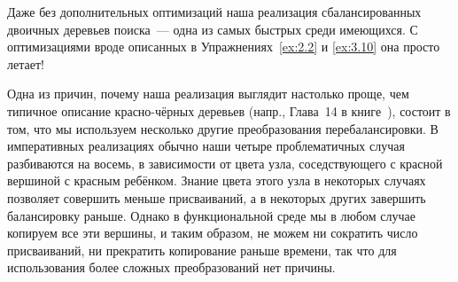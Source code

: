 \begin{frame}[fragile]{}
\begin{figure}[h]
  \centering
  
  \label{fig:3.5}
\end{figure}
\end{frame}

\begin{frame}[fragile]{}
\begin{figure}[h]
  \centering
  
  \label{fig:3.5.2}
\end{figure}
\end{frame}

\begin{frame}[fragile]{}
\begin{hint}
  Даже без дополнительных оптимизаций наша реализация сбалансированных
  двоичных деревьев поиска~--- одна из самых быстрых среди
  имеющихся. С оптимизациями вроде описанных в
  Упражнениях~\ref{ex:2.2} и \ref{ex:3.10} она просто летает!
\end{hint}
\end{frame}


\begin{frame}[fragile]{}
\begin{remark}
  Одна из причин, почему наша реализация выглядит настолько проще, чем
  типичное описание красно-чёрных деревьев (напр., Глава~14 в
  книге~\cite{CormenLeisersonRivest1990}), состоит в том, что мы
  используем несколько другие преобразования перебалансировки. В
  императивных реализациях обычно наши четыре проблематичных случая
  разбиваются на восемь, в зависимости от цвета узла, соседствующего с
  красной вершиной с красным ребёнком.  Знание цвета этого узла в
  некоторых случаях позволяет совершить меньше присваиваний, а в
  некоторых других завершить балансировку раньше. Однако в
  функциональной среде мы в любом случае копируем все эти вершины, и
  таким образом, не можем ни сократить число присваиваний, ни
  прекратить копирование раньше времени, так что для использования
  более сложных преобразований нет причины.
\end{remark}

\end{frame}



